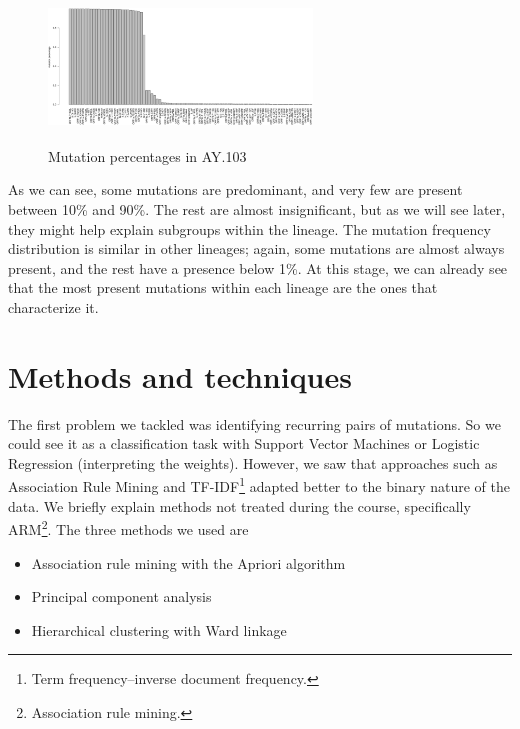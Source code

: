 \documentclass[twoside,twocolumn]{article}
\begin{document}
\begin{figure}[h]
	\caption{Mutation percentages in AY.103}
	\label{ay103barplot}
	\centering
	\includegraphics[width=70mm, height=40mm]{ay103barplot.png}
\end{figure}
As we can see, some mutations are predominant, and very few are present between 10\% and 90\%. The rest are almost insignificant, but as we will see later, they might help explain subgroups within the lineage. The mutation frequency distribution is similar in other lineages; again, some mutations are almost always present, and the rest have a presence below 1\%. At this stage, we can already see that the most present mutations within each lineage are the ones that characterize it.
	
\section{Methods and techniques}

The first problem we tackled was identifying recurring pairs of mutations. So we could see it as a classification task with Support Vector Machines or Logistic Regression (interpreting the weights). However, we saw that approaches such as Association Rule Mining\cite{armpaper} and TF-IDF\footnote{Term frequency–inverse document frequency.}\cite{tfidf} adapted better to the binary nature of the data.
We briefly explain methods not treated during the course, specifically ARM\footnote{Association rule mining.}. The three methods we used are
\begin{itemize}
	\item Association rule mining with the Apriori algorithm
	\item Principal component analysis
	\item Hierarchical clustering with Ward linkage\cite{ward}
\end{itemize}
\end{document}
